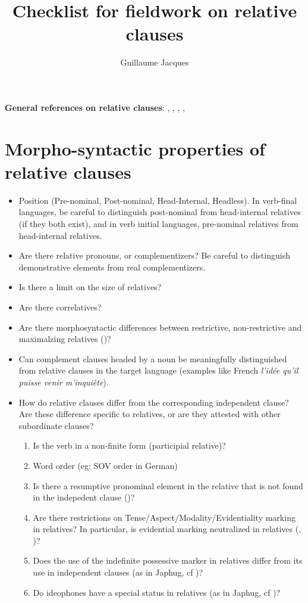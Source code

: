 \documentclass[oneside,a4paper,11pt]{article}
\begin{document}
 
\title{Checklist for fieldwork on relative clauses}
\author{Guillaume Jacques}
\maketitle

\textbf{General references on relative clauses}: \citet{comrie81relative}, \citet{lehmann86relatives}, \citet[205-250]{creissels06sgit2}, \citet{andrews07relatives}, \citet[313-369]{dixon10basic2}

\section{Morpho-syntactic properties of relative clauses}




\begin{itemize}
\item Position (Pre-nominal, Post-nominal, Head-Internal, Headless). In verb-final languages, be careful to distinguish post-nominal from head-internal relatives (if they both exist), and in verb initial languages, pre-nominal relatives from head-internal relatives.
\item Are there relative pronouns, or complementizers? Be careful to distinguish demonstrative elements from real complementizers.
\item Is there a limit on the size of relatives?
\item Are there correlatives?
\item Are there morphosyntactic differences between restrictive, non-restrictive and maximalzing relatives (\citealt{grosu98maximalizing})?
\item Can complement clauses headed by a noun be meaningfully distinguished from relative clauses in the target language (examples like French \textit{l'idée qu'il puisse venir m'inquiète}).
\item How do relative clauses differ from the corresponding independent clause? Are these difference specific to relatives, or are they attested with other subordinate clauses?
\begin{enumerate}
\item Is the verb in a non-finite form (participial relative)?
\item Word order (eg: SOV order in German)
\item Is there a resumptive pronominal element in the relative that is not found in the indepedent clause (\citealt{comrie81relative})?
\item Are there restrictions on Tense/Aspect/Modality/Evidentiality marking in relatives? In particular, is evidential marking neutralized in relatives (\citealt[253-6]{aikhenvald06}, \citealt{jacques16relatives})?
\item Does the use of the indefinite possessive marker  in relatives differ from its use in independent clauses (as in Japhug, cf \citealt{jacques16relatives})?
\item Do ideophones have a special status in relatives (as in Japhug, cf \citealt[275]{japhug14ideophones})?
\end{enumerate}
\end{itemize}
\end{document}
